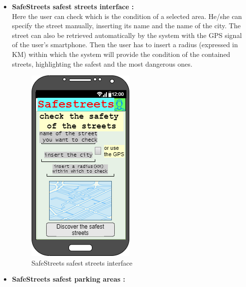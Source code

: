 \documentclass[titlepage]{article}
\begin{document}
\begin{itemize}
\begin{itemize}
	\newpage		
	
	
	

	
	
	\item \textbf{SafeStreets safest streets interface :}\\
		
	Here the user can check which is the condition of a selected area. He/she can specify the street manually, inserting its name and the name of the city. The street can also be retrieved automatically by the system with the GPS signal of the user's smartphone. Then the user has to insert a radius (expressed in KM) within which the system will provide the condition of the contained streets, highlighting the safest and the most dangerous ones.
	\begin{figure}[h]
	\includegraphics[scale=0.8]{Mockups/safest streets.png}
	\centering
	\caption{SafeStreets safest streets interface}
	\end{figure}
	\FloatBarrier
	
	\newpage		
	
	
	
	
	\item \textbf{SafeStreets safest parking areas :}\\
		

\end{itemize}
\end{itemize}
\end{document}
